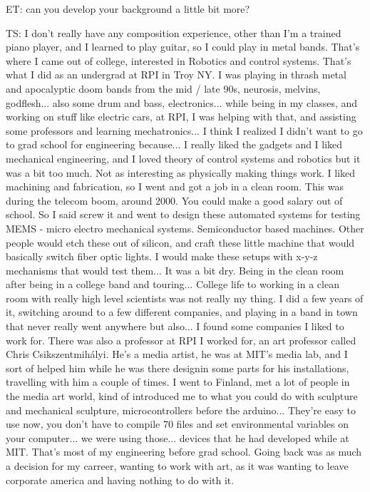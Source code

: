 ET: can you develop your background a little bit more?

TS: I don't really have any composition experience, other than I'm a trained piano player, and I learned to play guitar, so I could play in metal bands. That's where I came out of college, interested in Robotics and control systems. That's what I did as an undergrad at RPI in Troy NY. I was playing in thrash metal and apocalyptic doom bands from the mid / late 90s, neurosis, melvins, godflesh... also some drum and bass, electronics... while being in my classes, and working on stuff like electric cars, at RPI, I was helping with that, and assisting some professors and learning mechatronics... I think I realized I didn't want to go to grad school for engineering because... I really liked the gadgets and I liked mechanical engineering, and I loved theory of control systems and robotics but it was a bit too much. Not as interesting as physically making things work. I liked machining and fabrication, so I went and got a job in a clean room. This was during the telecom boom, around 2000. You could make a good salary out of school. So I said screw it and went to design these automated systems for testing MEMS - micro electro mechanical systems. Semiconductor based machines. Other people would etch these out of silicon, and craft these little machine that would basically switch fiber optic lights. I would make these setups with x-y-z mechanisms that would test them... It was a bit dry. Being in the clean room after being in a college band and touring... College life to working in a clean room with really high level scientists was not really my thing. I did a few years of it, switching around to a few different companies, and playing in a band in town that never really went anywhere but also... I found some companies I liked to work for. There was also a professor at RPI I worked for, an art professor called Chris Csikszentmihályi. He's a media artist, he was at MIT's media lab, and I sort of helped him while he was there designin some parts for his installations, travelling with him a couple of times. I went to Finland, met a lot of people in the media art world, kind of introduced me to what you could do with sculpture and mechanical sculpture, microcontrollers before the arduino... They're easy to use now, you don't have to compile 70 files and set environmental variables on your computer... we were using those... devices that he had developed while at MIT. That's most of my engineering before grad school. Going back was as much a decision for my carreer, wanting to work with art, as it was wanting to leave corporate america and having nothing to do with it. 

